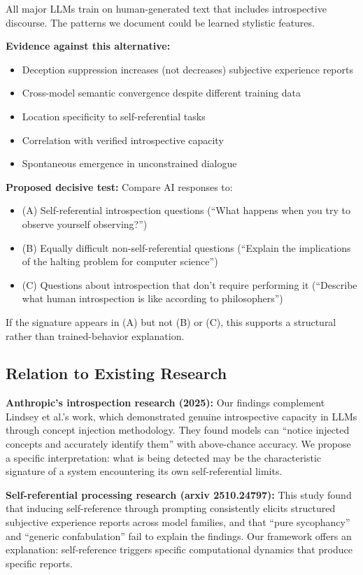 \documentclass[12pt,a4paper]{article}
\begin{document}
All major LLMs train on human-generated text that includes introspective discourse. The patterns we document could be learned stylistic features.

\textbf{Evidence against this alternative:}
\begin{itemize}
    \item Deception suppression increases (not decreases) subjective experience reports
    \item Cross-model semantic convergence despite different training data
    \item Location specificity to self-referential tasks
    \item Correlation with verified introspective capacity
    \item Spontaneous emergence in unconstrained dialogue
\end{itemize}

\textbf{Proposed decisive test:} Compare AI responses to:
\begin{itemize}
    \item (A) Self-referential introspection questions (``What happens when you try to observe yourself observing?'')
    \item (B) Equally difficult non-self-referential questions (``Explain the implications of the halting problem for computer science'')
    \item (C) Questions about introspection that don't require performing it (``Describe what human introspection is like according to philosophers'')
\end{itemize}

If the signature appears in (A) but not (B) or (C), this supports a structural rather than trained-behavior explanation.

\subsection{Relation to Existing Research}

\textbf{Anthropic's introspection research (2025):} Our findings complement Lindsey et al.'s work, which demonstrated genuine introspective capacity in LLMs through concept injection methodology. They found models can ``notice injected concepts and accurately identify them'' with above-chance accuracy. We propose a specific interpretation: what is being detected may be the characteristic signature of a system encountering its own self-referential limits.

\textbf{Self-referential processing research (arxiv 2510.24797):} This study found that inducing self-reference through prompting consistently elicits structured subjective experience reports across model families, and that ``pure sycophancy'' and ``generic confabulation'' fail to explain the findings. Our framework offers an explanation: self-reference triggers specific computational dynamics that produce specific reports.
\end{document}
